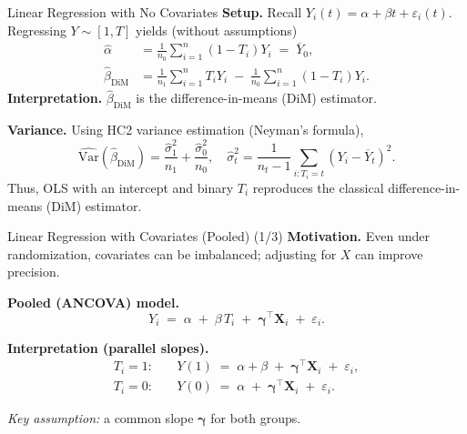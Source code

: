 \documentclass[10pt, handout]{beamer}
\theoremstyle{plain}
\newcommand{\bX}{\bm{X}}
\newcommand{\Var}{\mathrm{Var}}
\begin{document}
\begin{frame}{Linear Regression with No Covariates}
\small
\textbf{Setup.} Recall \(Y_i(t) = \alpha + \beta t + \varepsilon_i(t)\).  
Regressing \(Y \sim [1, T]\) yields (without assumptions)
\pause
\begin{align*}
\hat\alpha &= \frac{1}{n_0}\sum_{i=1}^n (1-T_i)Y_i \;=\; \overline{Y}_0, \\[4pt]
\hat\beta_{\text{DiM}} &= \frac{1}{n_1}\sum_{i=1}^n T_i Y_i 
\;-\; \frac{1}{n_0}\sum_{i=1}^n (1-T_i)Y_i.
\end{align*}
\pause
\textbf{Interpretation.}  
\(\hat\beta_{\text{DiM}}\) is the difference-in-means (DiM) estimator.
\pause
\medskip

\textbf{Variance.}  
Using HC2 variance estimation (Neyman’s formula),
\[
\widehat{\Var}(\hat\beta_{\text{DiM}}) = 
\frac{\hat\sigma_1^2}{n_1} + \frac{\hat\sigma_0^2}{n_0}, 
\quad 
\hat\sigma_t^2 = \frac{1}{n_t-1}\sum_{i:T_i=t}(Y_i-\overline{Y}_t)^2.
\]
\pause
Thus, OLS with an intercept and binary \(T_i\) reproduces the classical difference-in-means (DiM) estimator.
\end{frame}

\begin{frame}{Linear Regression with Covariates (Pooled) (1/3)}
\textbf{Motivation.} Even under randomization, covariates can be imbalanced; adjusting for \(X\) can improve precision.

\pause
\vspace{0.6em}
\textbf{Pooled (ANCOVA) model.}
\[
Y_i \;=\; \alpha \;+\; \beta\,T_i \;+\; \bm{\gamma}^\top \bX_i \;+\; \varepsilon_i.
\]

\pause
\vspace{0.8em}
\textbf{Interpretation (parallel slopes).}
\[
\begin{aligned}
T_i=1:\quad & Y(1) \;=\; \alpha + \beta \;+\; \bm{\gamma}^\top \bX_i \;+\; \varepsilon_i,\\[3pt]
T_i=0:\quad & Y(0) \;=\; \alpha \;+\; \bm{\gamma}^\top \bX_i \;+\; \varepsilon_i.
\end{aligned}
\]

\pause
\vspace{0.6em}
\emph{Key assumption:} a common slope \(\bm{\gamma}\) for both groups.
\end{frame}
\end{document}
